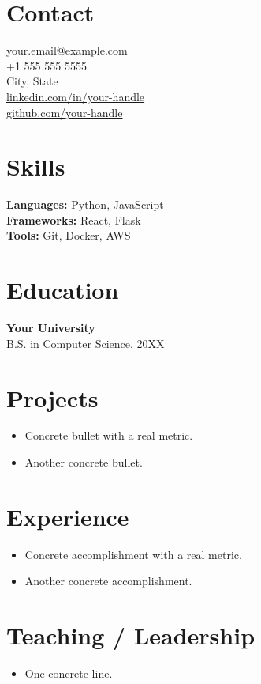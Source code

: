 \documentclass{resume}
\begin{document}
\beginresume



\section*{Contact}
your.email@example.com \\
+1 555 555 5555 \\
City, State \\
\href{https://linkedin.com/in/your-handle}{linkedin.com/in/your-handle} \\
\href{https://github.com/your-handle}{github.com/your-handle}

\section*{Skills}
\textbf{Languages:} Python, JavaScript \\
\textbf{Frameworks:} React, Flask \\
\textbf{Tools:} Git, Docker, AWS

\section*{Education}
\textbf{Your University} \\
B.S. in Computer Science, 20XX

\switchcolumn


\section*{Projects}

\begin{itemize}
\item Concrete bullet with a real metric.
\item Another concrete bullet.
\end{itemize}

\section*{Experience}

\begin{itemize}
\item Concrete accomplishment with a real metric.
\item Another concrete accomplishment.
\end{itemize}

\section*{Teaching / Leadership}

\begin{itemize}
\item One concrete line.
\end{itemize}

\endresume
\end{document}
